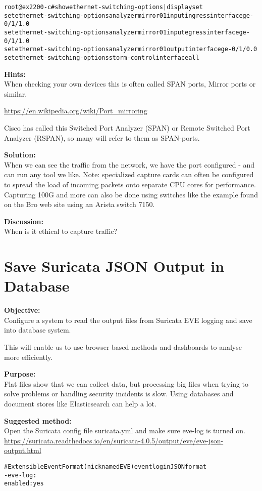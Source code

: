 \documentclass[a4paper,11pt,notitlepage]{report}
\begin{document}
\begin{alltt}
root@ex2200-c# show ethernet-switching-options | display set
set ethernet-switching-options analyzer mirror01 input ingress interface ge-0/1/1.0
set ethernet-switching-options analyzer mirror01 input egress interface ge-0/1/1.0
set ethernet-switching-options analyzer mirror01 output interface ge-0/1/0.0
set ethernet-switching-options storm-control interface all
\end{alltt}


{\bf Hints:}\\
When checking your own devices this is often called SPAN ports, Mirror ports or similar.

\url{https://en.wikipedia.org/wiki/Port_mirroring}

Cisco has called this Switched Port Analyzer (SPAN) or Remote Switched Port Analyzer (RSPAN), so many will refer to them as SPAN-ports.

{\bf Solution:}\\
When we can see the traffic from the network, we have the port configured - and can run any tool we like. Note: specialized capture cards can often be configured to spread the load of incoming packets onto separate CPU cores for performance. Capturing 100G and more can also be done using switches like the example found on the Bro web site using an Arista switch 7150.


{\bf Discussion:}\\
When is it ethical to capture traffic?


\chapter{Save Suricata JSON Output in Database}
\label{ex:suricatahasboards}


{\bf Objective:} \\
Configure a system to read the output files from Suricata EVE logging and save into database system.

This will enable us to use browser based methods and dashboards to analyse more efficiently.


{\bf Purpose:}\\
Flat files show that we can collect data, but processing big files when trying to solve problems or handling security incidents is slow. Using databases and document stores like Elasticsearch can help a lot.


{\bf Suggested method:}\\
Open the Suricata config file suricata.yml and make sure eve-log is turned on.
\url{https://suricata.readthedocs.io/en/suricata-4.0.5/output/eve/eve-json-output.html}
\begin{alltt}
# Extensible Event Format (nicknamed EVE) event log in JSON format
- eve-log:
    enabled: yes
\end{alltt}
\end{document}
